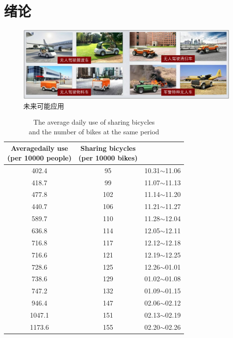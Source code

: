 \newpage
\section{绪论}

\begin{figure}[htbp]
	\centering
	\includegraphics[width = 1\textwidth]{fig/wlknyy.png}
	\caption{未来可能应用}
	\label{wlknyy}
\end{figure}

\begin{table}[htbp]
	\centering%
	\caption[centering]{The average daily use of sharing bicycles \protect\\and the number of bikes at the same period}%
	\label{共享单车日均使用总量与对应时间段的共享单车数量}%
	\begin{tabular}{ccc}
		\toprule
		\tabincell{c}{Averagedaily use\\(per 10000 people)} &\tabincell{c}{Sharing bicycles\\(per 10000 bikes)} &\tabincell{c}{Period}\\ 
		\midrule
		402.4 & 95 & 10.31$\sim$11.06 \\
		418.7 & 99 & 11.07$\sim$11.13 \\
		477.8 & 102 & 11.14$\sim$11.20 \\
		440.7 & 106 & 11.21$\sim$11.27 \\
		589.7 & 110 & 11.28$\sim$12.04 \\
		636.8 & 114 & 12.05$\sim$12.11 \\
		716.8 & 117 & 12.12$\sim$12.18 \\
		716.6 & 121 & 12.19$\sim$12.25 \\
		728.6 & 125 & 12.26$\sim$01.01 \\
		738.6 & 129 & 01.02$\sim$01.08 \\
		747.2 & 132 & 01.09$\sim$01.15 \\
		946.4 & 147 & 02.06$\sim$02.12 \\
		1047.1 & 151 & 02.13$\sim$02.19 \\
		1173.6 & 155 & 02.20$\sim$02.26 \\
		\bottomrule
	\end{tabular}
\end{table}